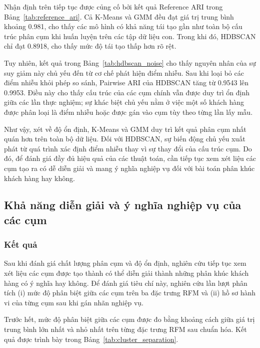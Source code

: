 \documentclass[12pt]{ai_conquer2026}
\begin{document}
Nhận định trên tiếp tục được củng cố bởi kết quả Reference ARI trong Bảng~\ref{tab:reference_ari}. Cả K-Means và GMM đều đạt giá trị trung bình khoảng 0.981, cho thấy các mô hình có khả năng tái tạo gần như toàn bộ cấu trúc phân cụm khi huấn luyện trên các tập dữ liệu con. Trong khi đó, HDBSCAN chỉ đạt 0.8918, cho thấy mức độ tái tạo thấp hơn rõ rệt.

Tuy nhiên, kết quả trong Bảng~\ref{tab:hdbscan_noise} cho thấy nguyên nhân của sự suy giảm này chủ yếu đến từ cơ chế phát hiện điểm nhiễu. Sau khi loại bỏ các điểm nhiễu khỏi phép so sánh, Pairwise ARI của HDBSCAN tăng từ 0.9543 lên 0.9953. Điều này cho thấy cấu trúc của các cụm chính vẫn được duy trì ổn định giữa các lần thực nghiệm; sự khác biệt chủ yếu nằm ở việc một số khách hàng được phân loại là điểm nhiễu hoặc được gán vào cụm tùy theo từng lần lấy mẫu.

Như vậy, xét về độ ổn định, K-Means và GMM duy trì kết quả phân cụm nhất quán hơn trên toàn bộ dữ liệu. Đối với HDBSCAN, sự biến động chủ yếu xuất phát từ quá trình xác định điểm nhiễu thay vì sự thay đổi của cấu trúc cụm. Do đó, để đánh giá đầy đủ hiệu quả của các thuật toán, cần tiếp tục xem xét liệu các cụm tạo ra có dễ diễn giải và mang ý nghĩa nghiệp vụ đối với bài toán phân khúc khách hàng hay không.

\subsection{Khả năng diễn giải và ý nghĩa nghiệp vụ của các cụm}

\subsubsection{Kết quả}

Sau khi đánh giá chất lượng phân cụm và độ ổn định, nghiên cứu tiếp tục xem xét liệu các cụm được tạo thành có thể diễn giải thành những phân khúc khách hàng có ý nghĩa hay không. Để đánh giá tiêu chí này, nghiên cứu lần lượt phân tích (i) mức độ phân biệt giữa các cụm trên ba đặc trưng RFM và (ii) hồ sơ hành vi của từng cụm sau khi gán nhãn nghiệp vụ.

Trước hết, mức độ phân biệt giữa các cụm được đo bằng khoảng cách giữa giá trị trung bình lớn nhất và nhỏ nhất trên từng đặc trưng RFM sau chuẩn hóa. Kết quả được trình bày trong Bảng~\ref{tab:cluster_separation}.
\end{document}
